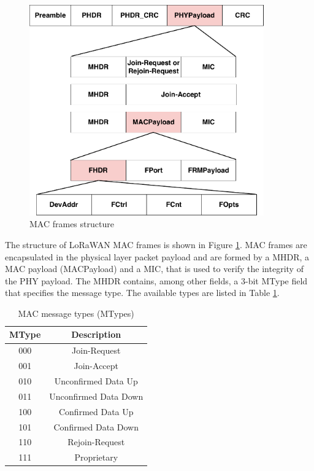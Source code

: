 \begin{figure}[h]
    \centering
    \includegraphics[width=0.9\textwidth]{images/mac-commands.pdf}
    \caption{MAC frames structure}
    \label{fig:lorawan-mac}
\end{figure}

The structure of LoRaWAN MAC frames is shown in Figure \ref{fig:lorawan-mac}.
MAC frames are encapsulated in the physical layer packet payload and are formed by a \gls{MHDR}, a MAC payload (MACPayload) and a \gls{MIC}, that is used to verify the integrity of the PHY payload. 
The \gls{MHDR} contains, among other fields, a 3-bit MType field that specifies the message type. The available types are listed in Table \ref{tab:mtypes}.

\begin{table}[]
\centering

\begin{tabular}{|c|c|}
\hline
\textbf{MType} & \textbf{Description}\\ \hline
 000 & Join-Request  \\ \hline
 001 & Join-Accept \\ \hline
 010 & Unconfirmed Data Up  \\ \hline
 011 & Unconfirmed Data Down  \\ \hline
 100 & Confirmed Data Up \\ \hline 
 101 & Confirmed Data Down \\ \hline
 110 & Rejoin-Request \\ \hline  
 111 & Proprietary \\ \hline 
\end{tabular}
\caption{MAC message types (MTypes)}
\label{tab:mtypes}

\end{table}

